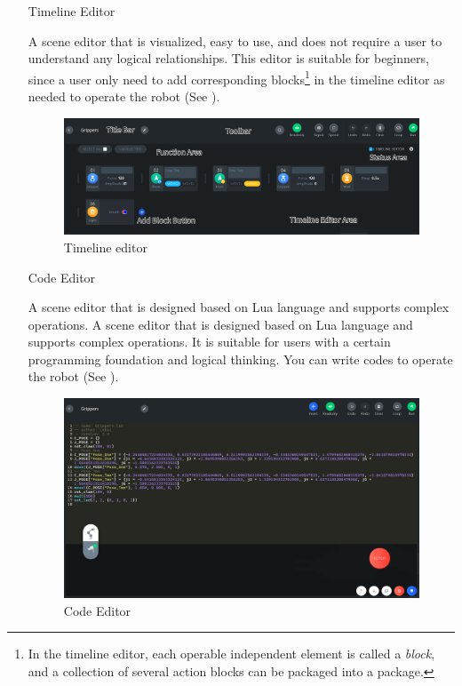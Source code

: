 \begin{itemize}[leftmargin=6.5em]
	\item [Timeline Editor]

	A scene editor that is visualized, easy to use, and does not require a user to understand any logical relationships. This editor is suitable for beginners, since a user only need to add corresponding blocks\footnote{In the timeline editor, each operable independent element is called a {\it block}, and a collection of several action blocks can be packaged into a package.} in the timeline editor as needed to operate the robot (See ).

	\begin{figure}[htb]
		\centering
		\includegraphics[width=\textwidth]{en/image/timeline.png}
		\caption{Timeline editor
		}
		\label{fig:时间轴编辑器}
	\end{figure}

	\newpage

	\item [Code Editor]

	A scene editor that is designed based on Lua language and supports complex operations. A scene editor that is designed based on Lua language and supports complex operations. It is suitable for users with a certain programming foundation and logical thinking. You can write codes to operate the robot (See ).

		\begin{figure}[htb]
			\centering
		\includegraphics[width=\textwidth]{en/image/code.png}
		\caption{Code Editor}
		\label{fig:代码编辑器}
	\end{figure}
\end{itemize}

